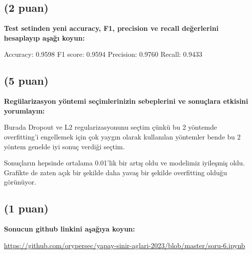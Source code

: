 \documentclass[11pt]{article}
\begin{document}
\subsection{(2 puan)} \textbf{Test setinden yeni accuracy, F1, precision ve recall değerlerini hesaplayıp aşağı koyun:}

Accuracy: 0.9598
F1 score: 0.9594
Precision: 0.9760
Recall: 0.9433

\subsection{(5 puan)} \textbf{Regülarizasyon yöntemi seçimlerinizin sebeplerini ve sonuçlara etkisini yorumlayın:}

Burada Dropout ve L2 regularizasyonunu seçtim çünkü bu 2 yöntemde overfitting'i engellemek için çok yaygın olarak kullanılan yöntemler bende bu 2 yöntem genelde iyi sonuç verdiği seçtim.

Sonuçların hepsinde ortalama 0.01'lik bir artış oldu ve modelimiz iyileşmiş oldu. Grafikte de zaten açık bir şekilde daha yavaş bir şekilde overfitting olduğu görünüyor.

\subsection{(1 puan)} \textbf{Sonucun github linkini  aşağıya koyun:}

\url{https://github.com/orypersec/yapay-sinir-aglari-2023/blob/master/soru-6.ipynb}
\end{document}
